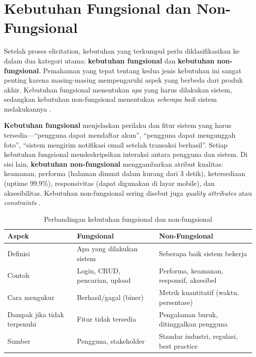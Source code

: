 ﻿\section{Kebutuhan Fungsional dan Non-Fungsional}

Setelah proses elicitation, kebutuhan yang terkumpul perlu diklasifikasikan ke dalam dua kategori utama: \textbf{kebutuhan fungsional} dan \textbf{kebutuhan non-fungsional}. Pemahaman yang tepat tentang kedua jenis kebutuhan ini sangat penting karena masing-masing mempengaruhi aspek yang berbeda dari produk akhir. Kebutuhan fungsional menentukan \textit{apa} yang harus dilakukan sistem, sedangkan kebutuhan non-fungsional menentukan \textit{seberapa baik} sistem melakukannya \cite{mdnLearn}.

\textbf{Kebutuhan fungsional} menjelaskan perilaku dan fitur sistem yang harus tersedia---``pengguna dapat mendaftar akun'', ``pengguna dapat mengunggah foto'', ``sistem mengirim notifikasi email setelah transaksi berhasil''. Setiap kebutuhan fungsional mendeskripsikan interaksi antara pengguna dan sistem. Di sisi lain, \textbf{kebutuhan non-fungsional} menggambarkan atribut kualitas: keamanan, performa (halaman dimuat dalam kurang dari 3 detik), ketersediaan (uptime 99.9\%), responsivitas (dapat digunakan di layar mobile), dan aksesibilitas. Kebutuhan non-fungsional sering disebut juga \textit{quality attributes} atau \textit{constraints} \cite{webdevLearn}.

\begin{table}[H]
\centering
\begin{tabular}{|P{2.5cm}|P{4cm}|P{5.5cm}|}
\hline
\textbf{Aspek} & \textbf{Fungsional} & \textbf{Non-Fungsional} \\
\hline
Definisi & Apa yang dilakukan sistem & Seberapa baik sistem bekerja \\
\hline
Contoh & Login, CRUD, pencarian, upload & Performa, keamanan, responsif, aksesibel \\
\hline
Cara mengukur & Berhasil/gagal (biner) & Metrik kuantitatif (waktu, persentase) \\
\hline
Dampak jika tidak terpenuhi & Fitur tidak tersedia & Pengalaman buruk, ditinggalkan pengguna \\
\hline
Sumber & Pengguna, stakeholder & Standar industri, regulasi, best practice \\
\hline
\end{tabular}
\caption{Perbandingan kebutuhan fungsional dan non-fungsional}
\end{table}

